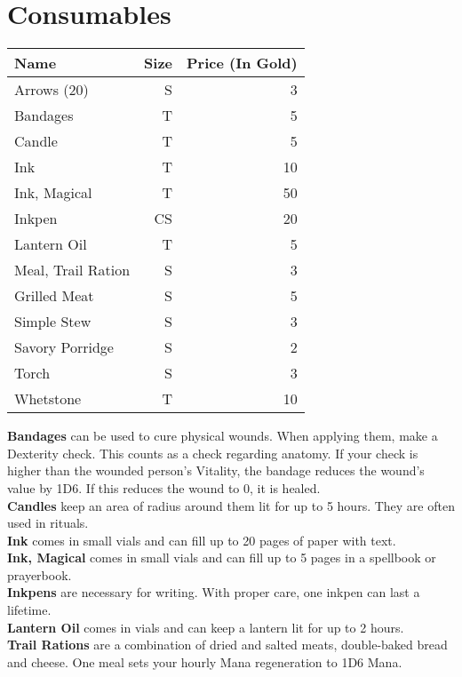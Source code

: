 \section{Consumables}
\begin{longtable}{l | r | r}
	Name & Size & Price (In Gold)\\ \hline
	Arrows (20) & S & 3\\
	Bandages & T & 5\\
	Candle & T & 5\\
	Ink & T & 10\\
	Ink, Magical & T & 50\\
	Inkpen & CS & 20\\
	Lantern Oil & T & 5\\
	Meal, Trail Ration & S & 3\\
	Grilled Meat & S & 5\\
	Simple Stew & S & 3\\
	Savory Porridge & S & 2\\
	Torch & S & 3\\
	Whetstone & T & 10\\
\end{longtable}


\textbf{Bandages} can be used to cure physical wounds. When applying them, make a Dexterity check. This counts as a check regarding anatomy. If your check is higher than the wounded person's Vitality, the bandage reduces the wound's value by 1D6. If this reduces the wound to 0, it is healed.\\


\textbf{Candles} keep an area of  radius around them lit for up to 5 hours. They are often used in rituals.\\


\textbf{Ink} comes in small vials and can fill up to 20 pages of paper with text.\\

\textbf{Ink, Magical} comes in small vials and can fill up to 5 pages in a spellbook or prayerbook.\\


\textbf{Inkpens} are necessary for writing. With proper care, one inkpen can last a lifetime.\\


\textbf{Lantern Oil} comes in vials and can keep a lantern lit for up to 2 hours.\\


\textbf{Trail Rations} are a combination of dried and salted meats, double-baked bread and cheese. One meal sets your hourly Mana regeneration to 1D6 Mana.\\


